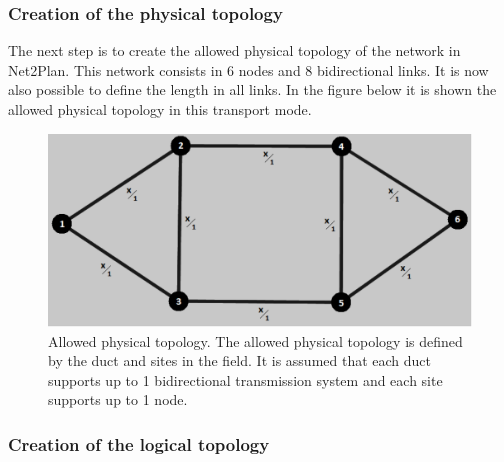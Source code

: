 \newpage
\subsubsection{Creation of the physical topology}

\vspace{11pt}
The next step is to create the allowed physical topology of the network in Net2Plan. This network consists in 6 nodes and 8 bidirectional links. It is now also possible to define the length in all links. In the figure below it is shown the allowed physical topology in this transport mode.

\begin{figure}[H]
\centering
\includegraphics[width=13cm]{sdf/heuristic/translucent_survivability/figures/allowed_physical}
\caption{Allowed physical topology. The allowed physical topology is defined by the duct and sites in the field. It is assumed that each duct supports up to 1 bidirectional transmission system and each site supports up to 1 node.}
\label{allowed_physical_surv}
\end{figure}

\subsubsection{Creation of the logical topology}

